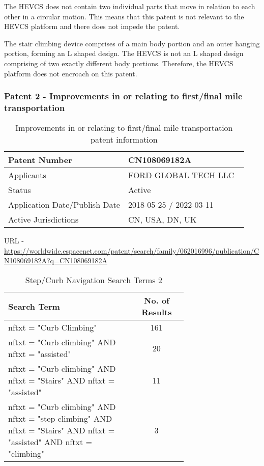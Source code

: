 \documentclass [12pt]{article}
\begin{document}
The HEVCS does not contain two individual parts that move in relation to each other in a circular motion. This means that this patent is not relevant to the HEVCS platform and there does not impede the patent.

The stair climbing device comprises of a main body portion and an outer hanging portion, forming an L shaped design.
The HEVCS is not an L shaped design comprising of two exactly different body portions. Therefore, the HEVCS platform does not encroach on this patent.

\subsubsection{Patent 2 - Improvements in or relating to first/final mile transportation}

\begin{table}[H]
    \centering
    \setlength{\arrayrulewidth}{1.5pt}
    \begin{tabular}{|p{0.5\linewidth}|p{0.5\linewidth}|}
    \hline
    Patent Number & CN108069182A\\
    \hline
    Applicants & FORD GLOBAL TECH LLC\\
    \hline
    Status & Active\\
    \hline
    Application Date/Publish Date & 2018-05-25 / 2022-03-11\\
    \hline
    Active Jurisdictions & CN, USA, DN, UK\\
    \hline
    \end{tabular}
    \caption{Improvements in or relating to first/final mile transportation patent information}
    \label{table:improvements_in_or_relating_to_first_final_mile_transportation_patent_information}
\end{table}

URL - \url{https://worldwide.espacenet.com/patent/search/family/062016996/publication/CN108069182A?q=CN108069182A}

\begin{table}[H]
    \centering
    \setlength{\arrayrulewidth}{1.5pt}
    \begin{tabular}{|p{0.7\linewidth}|c|}
    \hline
    \cellcolor{gray!40}Search Term & \cellcolor{gray!40}No. of Results \\
    \hline
    nftxt = "Curb Climbing" & 161 \\
    \hline
    nftxt = "Curb climbing" AND nftxt = "assisted" & 20 \\
    \hline
    nftxt = "Curb climbing" AND nftxt = "Stairs" AND nftxt = "assisted" & 11 \\
    \hline
    nftxt = "Curb climbing" AND nftxt = "step climbing" AND nftxt = "Stairs" AND nftxt = "assisted" AND nftxt = "climbing" & 3 \\
    \hline
    \end{tabular}
    \caption{Step/Curb Navigation Search Terms 2}
    \label{table:step_curb_nav_st_2}
\end{table}
\end{document}

